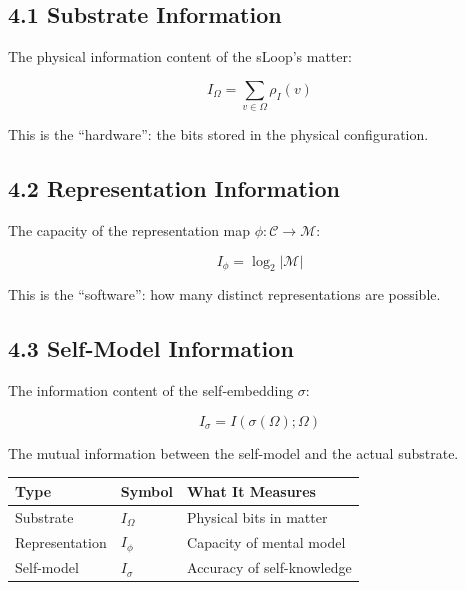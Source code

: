 \documentclass[
  11pt,
  letterpaper,
  twoside,
  openany]{book}
\makeatletter
\let\orig@subsection\subsection
\renewcommand{\subsection}{\needspace{6\baselineskip}\orig@subsection}
\makeatother
\begin{document}
\subsection{4.1 Substrate Information}\label{substrate-information}

The physical information content of the sLoop's matter:

\[I_\Omega = \sum_{v \in \Omega} \rho_I(v)\]

This is the ``hardware'': the bits stored in the physical configuration.

\subsection{4.2 Representation
Information}\label{representation-information}

The capacity of the representation map
\(\phi: \mathcal{C} \to \mathcal{M}\):

\[I_\phi = \log_2 |\mathcal{M}|\]

This is the ``software'': how many distinct representations are
possible.

\subsection{4.3 Self-Model Information}\label{self-model-information}

The information content of the self-embedding \(\sigma\):

\[I_\sigma = I(\sigma(\Omega); \Omega)\]

The mutual information between the self-model and the actual substrate.

\begin{tcolorbox}[enhanced jigsaw, colbacktitle=quarto-callout-note-color!10!white, titlerule=0mm, bottomtitle=1mm, bottomrule=.15mm, colback=white, arc=.35mm, breakable, toprule=.15mm, title=\textcolor{quarto-callout-note-color}{\faInfo}\hspace{0.5em}{The Three Information Types}, rightrule=.15mm, coltitle=black, leftrule=.75mm, colframe=quarto-callout-note-color-frame, toptitle=1mm, opacityback=0, opacitybacktitle=0.6, left=2mm]

\begin{longtable}[]{@{}lll@{}}
\toprule\noalign{}
Type & Symbol & What It Measures \\
\midrule\noalign{}
\endhead
\bottomrule\noalign{}
\endlastfoot
Substrate & \(I_\Omega\) & Physical bits in matter \\
Representation & \(I_\phi\) & Capacity of mental model \\
Self-model & \(I_\sigma\) & Accuracy of self-knowledge \\
\end{longtable}

\end{tcolorbox}
\end{document}
